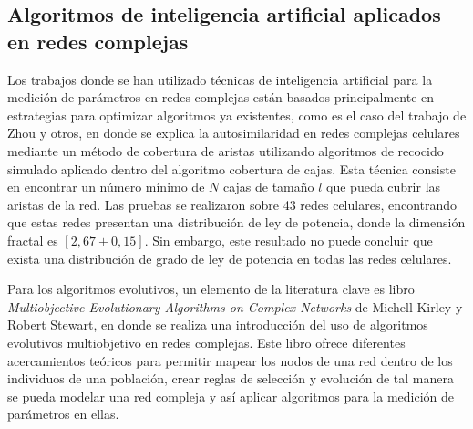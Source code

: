 \subsection{Algoritmos de inteligencia artificial aplicados en redes complejas}

Los trabajos donde se han utilizado técnicas de inteligencia artificial para la medición de parámetros en redes complejas están basados principalmente en estrategias para optimizar algoritmos ya existentes, como es el caso del trabajo de Zhou y otros\cite{Zhou2007}, en donde se explica la autosimilaridad en redes complejas celulares mediante un método de cobertura de aristas utilizando algoritmos de recocido simulado aplicado dentro del algoritmo cobertura de cajas. Esta técnica consiste en encontrar un número mínimo de $N$ cajas de tamaño $l$ que pueda cubrir las aristas de la red. Las pruebas se realizaron sobre 43 redes celulares, encontrando que estas redes presentan una distribución de ley de potencia, donde la dimensión fractal es $[2,67 \pm 0,15]$. Sin embargo, este resultado no puede concluir que exista una distribución de grado de ley de potencia en todas las redes celulares.

Para los algoritmos evolutivos, un elemento de la literatura clave es libro \textit{Multiobjective Evolutionary Algorithms on Complex Networks} de  Michell Kirley y Robert Stewart\cite{Michel2007}, en donde se realiza una introducción del uso
de algoritmos evolutivos multiobjetivo en redes complejas. Este libro ofrece diferentes acercamientos teóricos para permitir mapear los nodos de una red dentro de los individuos de una población, crear reglas de selección y evolución de tal manera se pueda modelar una red compleja y así aplicar algoritmos para la medición de parámetros en ellas.

